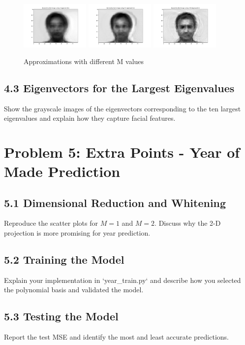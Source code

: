 \documentclass[12pt]{article}
\begin{document}
\begin{figure}[H]
    \centering
    \includegraphics[width=0.3\textwidth]{eigenface_M2.png}
    \includegraphics[width=0.3\textwidth]{eigenface_M10.png}
    \includegraphics[width=0.3\textwidth]{eigenface_M100.png}
    \caption{Approximations with different M values}
\end{figure}

\subsection*{4.3 Eigenvectors for the Largest Eigenvalues}
Show the grayscale images of the eigenvectors corresponding to the ten largest eigenvalues and explain how they capture facial features.

\section*{Problem 5: Extra Points - Year of Made Prediction}

\subsection*{5.1 Dimensional Reduction and Whitening}
Reproduce the scatter plots for \( M = 1 \) and \( M = 2 \). Discuss why the 2-D projection is more promising for year prediction.

\subsection*{5.2 Training the Model}
Explain your implementation in `year\_train.py` and describe how you selected the polynomial basis and validated the model.

\subsection*{5.3 Testing the Model}
Report the test MSE and identify the most and least accurate predictions.
\end{document}
